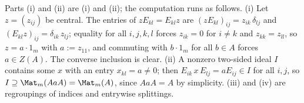 Parts (i) and (ii) are (i) and (ii); the computation runs as follows. (i) Let $z = (z_{ij})$ be central. The entries of $z E_{kl} = E_{kl} z$ are $(z E_{kl})_{ij} = z_{ik}\,\delta_{lj}$ and $(E_{kl} z)_{ij} = \delta_{ik}\, z_{lj}$; equality for all $i, j, k, l$ forces $z_{ik} = 0$ for $i \neq k$ and $z_{kk} = z_{ll}$, so $z = a \cdot 1_m$ with $a := z_{11}$, and commuting with $b \cdot 1_m$ for all $b \in A$ forces $a \in Z(A)$. The converse inclusion is clear. (ii) A nonzero two-sided ideal $I$ contains some $x$ with an entry $x_{kl} = a \neq 0$; then $E_{ik}\, x\, E_{lj} = a E_{ij} \in I$ for all $i, j$, so $I \supseteq \Mat_m(AaA) = \Mat_m(A)$, since $AaA = A$ by simplicity. (iii) and (iv) are regroupings of indices and entrywise splittings.
